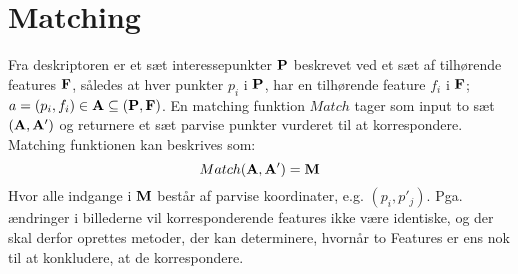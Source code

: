 \section{Matching}
Fra deskriptoren er et sæt interessepunkter $\bold{P}$ beskrevet ved et sæt af tilhørende features $\bold{F}$, således at hver punkter $p_i$ i $\bold{P}$, har en tilhørende feature $f_i$ i $\bold{F}$; $a = (p_i, f_i) \in \bold{A} \subseteq (\bold{P}, \bold{F})$. En matching funktion $Match$ tager som input to sæt $(\bold{A},\bold{A'})$ og returnere et sæt parvise punkter vurderet til at korrespondere. Matching funktionen kan beskrives som:
\begin{equation}
Match(\bold{A}, \bold{A}') = \bold{M}
\end{equation}
Hvor alle indgange i $\bold{M}$ består af parvise koordinater, e.g. $(p_i, p'_j)$. Pga. ændringer i billederne vil korresponderende features ikke være identiske, og der skal derfor oprettes metoder, der kan determinere, hvornår to Features er ens nok til at konkludere, at de korrespondere.